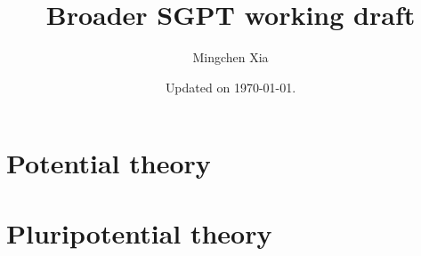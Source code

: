 \documentclass[envcountsect]{svmono}
\begin{document}
\author{Mingchen Xia}
\title{Broader SGPT working draft}
\date{Updated on \today.}
\maketitle
\frontmatter

\tableofcontents

\mainmatter
\part{Potential theory}






\part{Pluripotential theory}














\appendix
{}

\backmatter

\printindex


\end{document}
